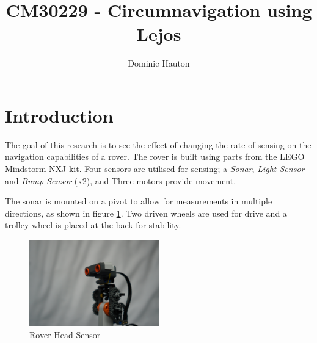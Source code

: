 \documentclass[a4paper,12pt,twocolumn]{report}
\title{CM30229 - Circumnavigation using Lejos}
\author{Dominic Hauton}
\begin{document}
\maketitle


\section{Introduction}



The goal of this research is to see the effect of changing the rate of sensing on the navigation capabilities of a rover. The rover is built using parts from the LEGO Mindstorm NXJ kit. Four sensors are utilised for sensing; a \emph{Sonar}, \emph{Light Sensor} and \emph{Bump Sensor} (x2), and Three motors provide movement.

The sonar is mounted on a pivot to allow for measurements in multiple directions, as shown in figure \ref{fig:stanley-head}. Two driven wheels are used for drive and a trolley wheel is placed at the back for stability.

\begin{figure}[b]
 \includegraphics[width=0.5\textwidth]{headshot}
 \caption{Rover Head Sensor}
 \label{fig:stanley-head}
\end{figure}
\end{document}
